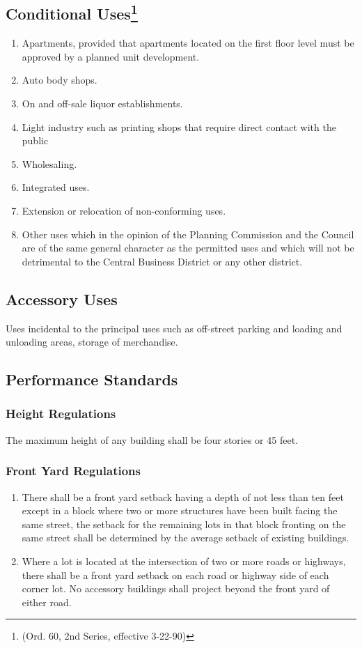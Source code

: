 \subsection{Conditional Uses\footnote{(Ord. 60, 2nd Series, effective 3-22-90)}}
\begin{enumerate}[{\indent}1)]
    \item Apartments, provided that apartments located on the first floor level must be approved by a planned unit development.
    \item Auto body shops.
    \item On and off-sale liquor establishments.
    \item Light industry such as printing shops that require direct contact with the public
    \item Wholesaling.
    \item Integrated uses.
    \item Extension or relocation of non-conforming uses.
    \item Other uses which in the opinion of the Planning Commission and the Council are of the same general character as the permitted uses and which will not be detrimental to the Central Business District or any other district.
\end{enumerate}
\subsection{Accessory Uses}
Uses incidental to the principal uses such as off-street parking and loading and unloading areas, storage of merchandise.
\subsection{Performance Standards}
\subsubsection{Height Regulations}
The maximum height of any building shall be four stories or 45 feet.
\subsubsection{Front Yard Regulations}
\begin{enumerate}[{\indent}a)]
    \item There shall be a front yard setback having a depth of not less than ten feet except in a block where two or more structures have been built facing the same street, the setback for the remaining lots in that block fronting on the same street shall be determined by the average setback of existing buildings.
    \item Where a lot is located at the intersection of two or more roads or highways, there shall be a front yard setback on each road or highway side of each corner lot.  No accessory buildings shall project beyond the front yard of either road.
\end{enumerate}

